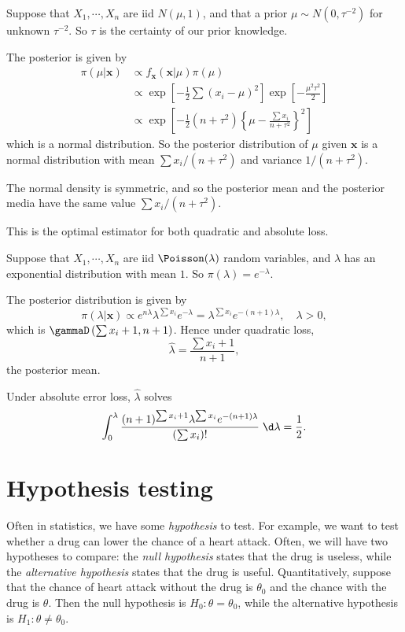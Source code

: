 \documentclass[a4paper]{article}
\begin{document}
\begin{eg}
  Suppose that $X_1, \cdots , X_n$ are iid $N(\mu, 1)$, and that a prior $\mu\sim N(0, \tau^{-2})$ for unknown $\tau^{-2}$. So $\tau$ is the certainty of our prior knowledge.

  The posterior is given by
  \begin{align*}
    \pi(\mu|\mathbf{x})&\propto f_\mathbf{x}(\mathbf{x}|\mu)\pi(\mu)\\
    &\propto \exp\left[-\frac{1}{2}\sum(x_i - \mu)^2\right]\exp\left[-\frac{\mu^2\tau^2}{2}\right]\\
    &\propto \exp\left[-\frac{1}{2}(n + \tau^2)\left\{\mu - \frac{\sum x_i}{n + \tau^2}\right\}^2\right]
  \end{align*}
  which is a normal distribution. So the posterior distribution of $\mu$ given $\mathbf{x}$ is a normal distribution with mean $\sum x_i/(n + \tau^2)$ and variance $1/(n + \tau^2)$.

  The normal density is symmetric, and so the posterior mean and the posterior media have the same value $\sum x_i/(n + \tau^2)$.

  This is the optimal estimator for both quadratic and absolute loss.
\end{eg}

\begin{eg}
  Suppose that $X_1, \cdots, X_n$ are iid $\Poisson(\lambda)$ random variables, and $\lambda$ has an exponential distribution with mean $1$. So $\pi(\lambda) = e^{-\lambda}.$

  The posterior distribution is given by
  \[
    \pi(\lambda|\mathbf{x}) \propto e^{n\lambda} \lambda^{\sum x_i}e^{-\lambda} = \lambda^{\sum x_i}e^{-(n + 1)\lambda},\quad \lambda > 0,
  \]
  which is $\gammaD\left(\sum x_i + 1, n + 1\right)$. Hence under quadratic loss,
  \[
    \hat{\lambda} = \frac{\sum x_i + 1}{n + 1},
  \]
  the posterior mean.

  Under absolute error loss, $\hat{\lambda}$ solves
  \[
    \int_0^{\lambda} \frac{(n + 1)^{\sum x_i + 1}\lambda^{\sum x_i}e ^{-(n + 1)\lambda}}{(\sum x_i)!}\;\d \lambda = \frac{1}{2}.
  \]
\end{eg}

\section{Hypothesis testing}
Often in statistics, we have some \emph{hypothesis} to test. For example, we want to test whether a drug can lower the chance of a heart attack. Often, we will have two hypotheses to compare: the \emph{null hypothesis} states that the drug is useless, while the \emph{alternative hypothesis} states that the drug is useful. Quantitatively, suppose that the chance of heart attack without the drug is $\theta_0$ and the chance with the drug is $\theta$. Then the null hypothesis is $H_0: \theta = \theta_0$, while the alternative hypothesis is $H_1: \theta \not= \theta_0$.
\end{document}
